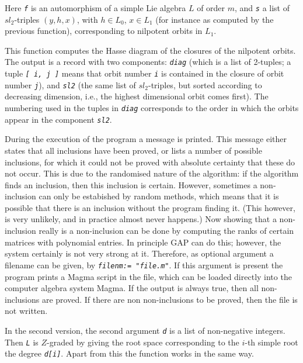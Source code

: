 \documentclass[a4paper,11pt]{report}
\begin{document}
{{{ Here \mbox{\texttt{\mdseries\slshape f}} is an automorphism of a simple Lie algebra $L$ of order $m$, and \mbox{\texttt{\mdseries\slshape s}} a list of $sl_2$-triples $(y,h,x)$, with $h\in L_0$, $x\in L_1$ (for instance as computed by the previous function), corresponding to
nilpotent orbits in $L_1$. 

 This function computes the Hasse diagram of the closures of the nilpotent
orbits. The output is a record with two components: \mbox{\texttt{\mdseries\slshape diag}} (which is a list of 2-tuples; a tuple \mbox{\texttt{\mdseries\slshape [ i, j ]}} means that orbit number \mbox{\texttt{\mdseries\slshape i}} is contained in the closure of orbit number \mbox{\texttt{\mdseries\slshape j}}), and \mbox{\texttt{\mdseries\slshape sl2}} (the same list of $sl_2$-triples, but sorted according to decreasing dimension, i.e., the highest
dimensional orbit comes first). The numbering used in the tuples in \mbox{\texttt{\mdseries\slshape diag}} corresponds to the order in which the orbits appear in the component \mbox{\texttt{\mdseries\slshape sl2}}. 

 During the execution of the program a message is printed. This message either
states that all inclusions have been proved, or lists a number of possible
inclusions, for which it could not be proved with absolute certainty that
these do not occur. This is due to the randomised nature of the algorithm: if
the algorithm finds an inclusion, then this inclusion is certain. However,
sometimes a non-inclusion can only be estabished by random methods, which
means that it is possible that there is an inclusion without the program
finding it. (This however, is very unlikely, and in practice almost never
happens.) Now showing that a non-inclusion really is a non-inclusion can be
done by computing the ranks of certain matrices with polynomial entries. In
principle \textsf{GAP} can do this; however, the system certainly is not very strong at it.
Therefore, as optional argument a filename can be given, by \mbox{\texttt{\mdseries\slshape filenm:= "file.m"}}. If this argument is present the program prints a Magma script in the file,
which can be loaded directly into the computer algebra system Magma. If the
output is always true, then all non-inclusions are proved. If there are non
non-inclusions to be proved, then the file is not written. 

 In the second version, the second argument \mbox{\texttt{\mdseries\slshape d}} is a list of non-negative integers. Then \mbox{\texttt{\mdseries\slshape L}} is $Z$-graded by giving the root space corresponding to the $i$-th simple root the degree \mbox{\texttt{\mdseries\slshape d[i]}}. Apart from this the function works in the same way. 

}}}
\end{document}
